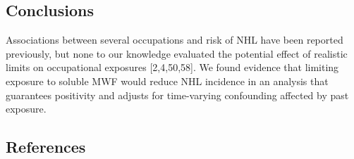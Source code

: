 \documentclass[
  11pt,
  letterpaper,
  DIV=11,
  numbers=noendperiod]{scrartcl}
\begin{document}
\subsection{Conclusions}\label{conclusions}

Associations between several occupations and risk of NHL have been
reported previously, but none to our knowledge evaluated the potential
effect of realistic limits on occupational exposures {[}2,4,50,58{]}. We
found evidence that limiting exposure to soluble MWF would reduce NHL
incidence in an analysis that guarantees positivity and adjusts for
time-varying confounding affected by past exposure. \newpage

\subsection{References}\label{references}
\end{document}
